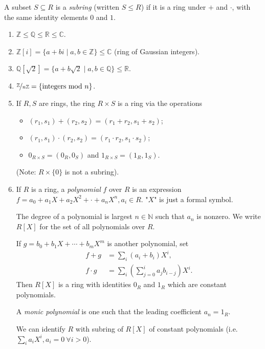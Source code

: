 \begin{definition}
    A subset \(S \subseteq R\) is a \textit{subring} (written \(S \leq R\)) if it is a ring under \(+\) and \(\cdot\), with the same identity elements \(0\) and \(1\).
\end{definition}
\begin{example}
    \leavevmode
    \begin{enumerate}
        \item \(\mathbb{Z} \leq \mathbb{Q}\leq \mathbb{R}\leq \mathbb{C}\).
        \item \(\mathbb{Z}[i] = \{a + bi\mid a,b \in \mathbb{Z}\}\leq \mathbb{C}\) (ring of Gaussian integers).
        \item \(\mathbb{Q}[\sqrt{2}] = \{a + b \sqrt{2} \mid a, b \in \mathbb{Q}\} \leq \mathbb{R}\).
        \item \(\nicefrac{\mathbb{Z}}{n\mathbb{Z}}=\{\text{integers mod }n\}\).
        \item If \(R, S\) are rings, the ring \(R \times S\) is a ring via the operations
        \begin{itemize}
            \item \((r_1,s_1) + (r_2, s_2) = (r_1 + r_2, s_1 + s_2)\);
            \item \((r_1,s_1)\cdot (r_2,s_2) = (r_1 \cdot r_2, s_1 \cdot s_2)\);
            \item \(0_{R\times S} = (0_R, 0_S)\) and \(1_{R\times S} = (1_R, 1_{S})\).
        \end{itemize}
        (Note: \(R \times \{0\}\) is not a subring).
        \item If \(R\) is a ring, a \textit{polynomial}  \(f\) over \(R\) is an expression \(f = a_0 + a_{1}X + a_2 X^2 + \cdot + a_n X^n, a_i \in R\). "\(X\)" is just a formal symbol.

        The degree of a polynomial is largest \(n \in \mathbb{N}\) such that \(a_n\) is nonzero. We write \(R[X]\) for the set of all polynomials over \(R\).

        If \(g = b_0 + b_1 X + \cdots + b_m X^m\) is another polynomial, set
        \begin{align*}
            f + g &= \sum\limits_{i}(a_i + b_i)X^i,\\
            f \cdot g &= \sum_i(\sum\limits_{j=0}^{i} a_{j}b_{i - j})X^i.
        \end{align*}
        Then \(R[X]\) is a ring with identities \(0_R\) and \(1_R\) which are constant polynomials.

        A \textit{monic polynomial}  is one such that the leading coefficient \(a_n = 1_R\).

        We can identify \(R\) with subring of \(R[X]\) of constant polynomials (i.e. \(\sum\limits_{i}^{} a_i X^i, a_i = 0~\forall i > 0\)).
    \end{enumerate}
\end{example}
